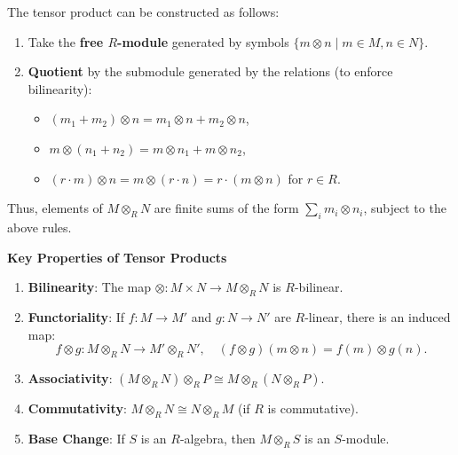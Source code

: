 \documentclass[openany]{book}
\begin{document}
\begin{prop}
The tensor product can be constructed as follows:
\begin{enumerate}
    \item Take the \textbf{free $R$-module} generated by symbols $\{m \otimes n \mid m \in M, n \in N\}$.

    \item \textbf{Quotient} by the submodule generated by the relations (to enforce bilinearity):
    \begin{itemize}
        \item $(m_1 + m_2) \otimes n = m_1 \otimes n + m_2 \otimes n$,
        \item $m \otimes (n_1 + n_2) = m \otimes n_1 + m \otimes n_2$,
        \item $(r \cdot m) \otimes n = m \otimes (r \cdot n) = r \cdot (m \otimes n)$ for $r \in R$.
    \end{itemize}
\end{enumerate}
Thus, elements of $M \otimes_R N$ are finite sums of the form $\sum_i m_i \otimes n_i$, subject to the above rules.

\textbf{Key Properties of Tensor Products}
\begin{enumerate}
    \item \textbf{Bilinearity}: The map $\otimes : M \times N \rightarrow M \otimes_R N$ is $R$-bilinear.

    \item \textbf{Functoriality}: If $f : M \rightarrow M'$ and $g : N \rightarrow N'$ are $R$-linear, there is an induced map:
    \[
    f \otimes g : M \otimes_R N \rightarrow M' \otimes_R N', \quad (f \otimes g)(m \otimes n) = f(m) \otimes g(n).
    \]

    \item \textbf{Associativity}: $(M \otimes_R N) \otimes_R P \cong M \otimes_R (N \otimes_R P)$.

    \item \textbf{Commutativity}: $M \otimes_R N \cong N \otimes_R M$ (if $R$ is commutative).

    \item \textbf{Base Change}: If $S$ is an $R$-algebra, then $M \otimes_R S$ is an $S$-module.
\end{enumerate}
\end{prop}
\end{document}

